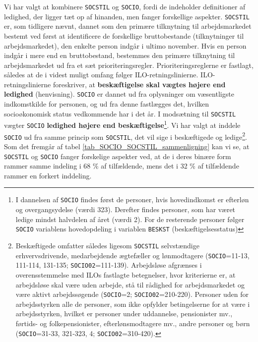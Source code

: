 Vi har valgt at kombinere \texttt{SOCSTIL} og \texttt{SOCIO}, fordi de indeholder definitioner af ledighed, der ligger tæt op af hinanden, men fanger forskellige aspekter. \texttt{SOCSTIL} er, som tidligere nævnt, dannet som den primære tilknytning til arbejdsmarkedet bestemt ved først at identificere de forskellige bruttobestande (tilknytninger til arbejdsmarkedet), den enkelte person indgår i ultimo november. Hvis en person indgår i mere end en bruttobestand, bestemmes den primære tilknytning til arbejdsmarkedet ud fra et sæt prioriteringsregler. Prioriteringsreglerne er fastlagt, således at de i videst muligt omfang følger ILO-retningslinierne. ILO-retningslinierne foreskriver, at \textbf{beskæftigelse skal vægtes højere end ledighed} (henvisning). \texttt{SOCIO} er dannet ud fra oplysninger om væsentligste indkomstkilde for personen, og ud fra denne fastlægges det, hvilken socioøkonomisk status vedkommende har i det år. I modsætning til \texttt{SOCSTIL} vægter \texttt{SOCIO} \textbf{ledighed højere end beskæftigelse}\footnote{I dannelsen af \texttt{SOCIO} findes først de personer, hvis hovedindkomst er efterløn og overgangsydelse (værdi 323). Derefter findes personer, som har været ledige mindst halvdelen af året (værdi 2). For de resterende personer følger \texttt{SOCIO} variablens hovedopdeling i variablen \texttt{BESKST} (beskæftigelsesstatus)}. Vi har valgt at inddele \texttt{SOCIO} ud fra samme princip som \texttt{SOCSTIL}, det vil sige i beskæftigede og ledige\footnote{Beskæftigede omfatter således ligesom \texttt{SOCSTIL} selvstændige erhvervsdrivende, medarbejdende ægtefæller og lønmodtagere (\texttt{SOCIO}=11-13, 111-114, 131-135; \texttt{SOCIO02}=111-139). Arbejdsløse afgrænses i overensstemmelse med ILOs fastlagte betegnelser, hvor kriterierne er, at arbejdsløse skal  være uden arbejde, stå til rådighed for arbejdsmarkedet og være aktivt arbejdssøgende (\texttt{SOCIO}=2; \texttt{SOCIO02}=210-220). Personer uden for arbejdsstyrken alle de personer, som ikke opfylder betingelserne for at være i arbejdsstyrken, hvilket er personer under uddannelse, pensionister mv., førtids- og folkepensionister, efterlønsmodtagere mv., andre personer og børn (\texttt{SOCIO}=31-33, 321-323, 4; \texttt{SOCIO02}=310-420).}. Som det fremgår af tabel \ref{tab_SOCIO_SOCSTIL_sammenligning} kan vi se, at \texttt{SOCSTIL} og \texttt{SOCIO} fanger forskelige aspekter ved, at de i deres binære form rammer samme indeling i 68 \% af tilfældende, mens det i 32 \% af tilfældende rammer en forkert inddeling.
